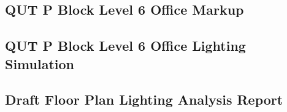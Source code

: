 \newpage

\subsection{QUT P Block Level 6 Office Markup}
\label{appendix:qut_lvl6_markup}



\subsection{QUT P Block Level 6 Office Lighting Simulation}
\label{appendix:QUT-Lvl6-office-rev3}



\subsection{Draft Floor Plan Lighting Analysis Report}
\label{appenddix:DraftFloorPlanLighting}



